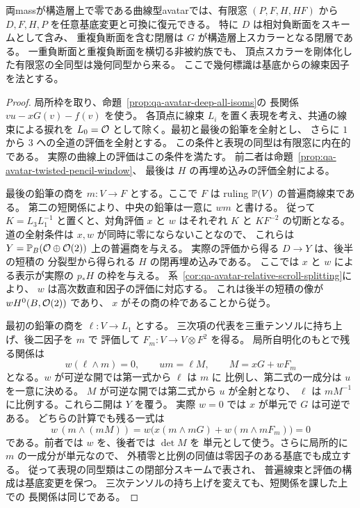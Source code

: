 \begin{theorem}[両mass零の有限窓からの相対曲線と標識の復元]
\label{thm:qa-avatar-deep-relative-point-reconstruction}
両massが構造層上で零である曲線型avatarでは、有限窓
$(P,F,H,HF)$ から $D,F,H,P$ を任意基底変更と可換に復元できる。
特に $D$ は相対負断面をスキームとして含み、
重複負断面を含む閉層は $G$ が構造層上スカラーとなる閉層である。
一重負断面と重複負断面を横切る非被約族でも、
頂点スカラーを剛体化した有限窓の全同型は幾何同型から来る。
ここで幾何標識は基底からの線束因子を法とする。
\end{theorem}
\begin{proof}
局所枠を取り、命題~\ref{prop:qa-avatar-deep-all-isoms}の
長関係 $vu-xG(v)-f(v)$ を使う。
各頂点に線束 $L_i$ を置く表現を考え、共通の線束による捩れを
$L_0=\mathcal O$ として除く。最初と最後の鉛筆を全射とし、
さらに $1$ から $3$ への全道の評価を全射とする。
この条件と表現の同型は有限窓に内在的である。
実際の曲線上の評価はこの条件を満たす。
前二者は命題~\ref{prop:qa-avatar-twisted-pencil-window}、
最後は $H$ の再埋め込みの評価全射による。

最後の鉛筆の商を $m:V\to F$ とする。ここで $F$ は
ruling $\mathbb P(V)$ の普遍商線束である。
第二の短関係により、中央の鉛筆は一意に $w m$ と書ける。
従って $K=L_3L_1^{-1}$ と置くと、対角評価 $x$ と
$w$ はそれぞれ $K$ と $KF^{-2}$ の切断となる。
道の全射条件は $x,w$ が同時に零にならないことなので、
これらは $Y=\mathbb P_B(\mathcal O\oplus\mathcal O(2))$ 上の普遍商を与える。
実際の評価から得る $D\to Y$ は、後半の短積の
分裂型から得られる $H$ の閉再埋め込みである。
ここでは $x$ と $w$ による表示が実際の $p_*H$ の枠を与える。
系~\ref{cor:qa-avatar-relative-scroll-splitting}により、
$w$ は高次数直和因子の評価に対応する。
これは後半の短積の像が $wH^0(B,\mathcal O(2))$ であり、
$x$ がその商の枠であることから従う。

最初の鉛筆の商を $\ell:V\to L_1$ とする。
三次項の代表を三重テンソルに持ち上げ、後二因子を $m$ で
評価して $F_m:V\to V\otimes F^2$ を得る。
局所自明化のもとで残る関係は
\[
 w(\ell\wedge m)=0,\qquad u m=\ell M,\qquad
 M=xG+wF_m
\]
となる。$w$ が可逆な開では第一式から $\ell$ は $m$ に
比例し、第二式の一成分は $u$ を一意に決める。
$M$ が可逆な開では第二式から $u$ が全射となり、
$\ell$ は $mM^{-1}$ に比例する。これら二開は $Y$ を覆う。
実際 $w=0$ では $x$ が単元で $G$ は可逆である。
どちらの計算でも残る一式は
\[
 w\,(m\wedge(mM))=
 w\bigl(x(m\wedge mG)+w(m\wedge mF_m)\bigr)=0
\]
である。前者では $w$ を、後者では $\det M$ を
単元として使う。さらに局所的に $m$ の一成分が単元なので、
外積零と比例の同値は零因子のある基底でも成立する。
従って表現の同型類はこの閉部分スキームで表され、
普遍線束と評価の構成は基底変更を保つ。
三次テンソルの持ち上げを変えても、短関係を課した上での
長関係は同じである。


\end{proof}

